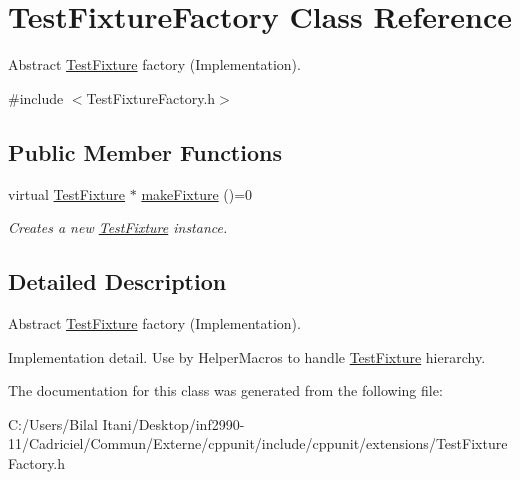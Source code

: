 \hypertarget{class_test_fixture_factory}{}\section{Test\+Fixture\+Factory Class Reference}
\label{class_test_fixture_factory}


Abstract \hyperlink{class_test_fixture}{Test\+Fixture} factory (Implementation).  




{\ttfamily \#include $<$Test\+Fixture\+Factory.\+h$>$}

\subsection*{Public Member Functions}
\begin{DoxyCompactItemize}
\item 
virtual \hyperlink{class_test_fixture}{Test\+Fixture} $\ast$ \hyperlink{class_test_fixture_factory_a50ae33b88d818ef819478e47929a820c}{make\+Fixture} ()=0\hypertarget{class_test_fixture_factory_a50ae33b88d818ef819478e47929a820c}{}\label{class_test_fixture_factory_a50ae33b88d818ef819478e47929a820c}

\begin{DoxyCompactList}\small\item\em Creates a new \hyperlink{class_test_fixture}{Test\+Fixture} instance. \end{DoxyCompactList}\end{DoxyCompactItemize}


\subsection{Detailed Description}
Abstract \hyperlink{class_test_fixture}{Test\+Fixture} factory (Implementation). 

Implementation detail. Use by Helper\+Macros to handle \hyperlink{class_test_fixture}{Test\+Fixture} hierarchy. 

The documentation for this class was generated from the following file\+:\begin{DoxyCompactItemize}
\item 
C\+:/\+Users/\+Bilal Itani/\+Desktop/inf2990-\/11/\+Cadriciel/\+Commun/\+Externe/cppunit/include/cppunit/extensions/Test\+Fixture\+Factory.\+h\end{DoxyCompactItemize}
